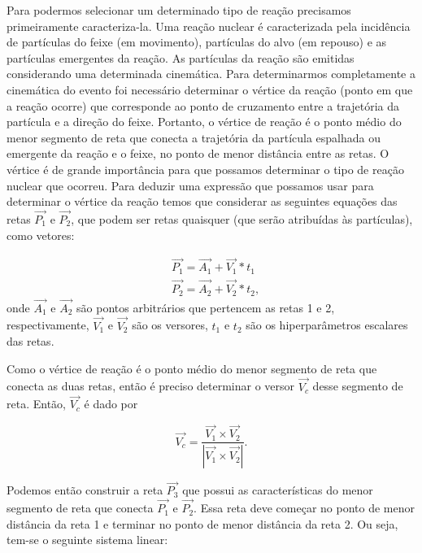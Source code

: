 \documentclass[a4paper,12pt,oneside]{book}
\begin{document}
\par Para podermos selecionar um determinado tipo de reação precisamos primeiramente caracteriza-la. Uma reação nuclear é caracterizada pela incidência de partículas do feixe (em movimento), partículas do alvo (em repouso) e as partículas emergentes da reação. As partículas da reação são emitidas considerando uma determinada cinemática. Para determinarmos completamente a cinemática do evento foi necessário determinar o vértice da reação (ponto em que a reação ocorre) que corresponde ao ponto de cruzamento entre a trajetória da partícula e a direção do feixe. Portanto, o vértice de reação é o ponto médio do menor segmento de reta que conecta a trajetória da partícula espalhada ou emergente da reação e o feixe, no ponto de menor distância entre as retas. O vértice é de grande importância para que possamos determinar o tipo de reação nuclear que ocorreu. Para deduzir uma expressão que possamos usar para determinar o vértice da reação temos que considerar as seguintes equações das retas $\vec{P_1}$ e $\vec{P_2}$, que podem ser retas quaisquer (que serão atribuídas às partículas), como vetores:

\begin{equation}
\begin{split}
        &\vec{P_1} = \vec{A_1} + \vec{V_1} * t_1 \\
        &\vec{P_2} = \vec{A_2} + \vec{V_2} * t_2,
\end{split}
\end{equation}
%
onde $\vec{A_1}$ e $\vec{A_2}$ são pontos arbitrários que pertencem as retas 1 e 2, respectivamente, $\vec{V_1}$ e $\vec{V_2}$ são os versores, $t_1$ e  $t_2$ são os hiperparâmetros escalares das retas.

\par Como o vértice de reação é o ponto médio do menor segmento de reta que conecta as duas retas, então é preciso determinar o versor $\vec{V_c}$ desse segmento de reta. Então, $\vec{V_c}$ é dado por

\begin{equation}\label{eq:versor_menor_dist}
    \vec{V_c} = \frac{\vec{V_1} \times \vec{V_2}}{\left | \vec{V_1} \times \vec{V_2} \right |}.
\end{equation}

Podemos então construir a reta $\vec{P_3}$ que possui as características do menor segmento de reta que conecta $\vec{P_1}$ e $\vec{P_2}$. Essa reta deve começar no ponto de menor distância da reta 1 e terminar no ponto de menor distância da reta 2. Ou seja, tem-se o seguinte sistema linear:
\end{document}
